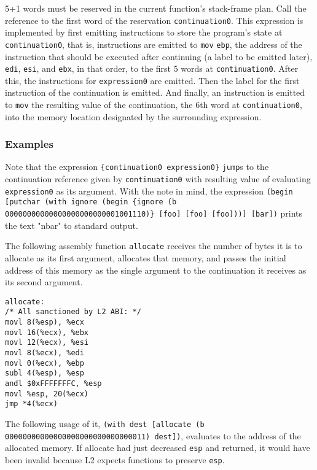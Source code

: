 \documentclass[twocolumn,landscape]{article}
\begin{document}
      5+1 words must be reserved in the current function's stack-frame plan. Call the reference to the first word of the reservation \lstinline{continuation0}. This expression is implemented by first emitting instructions to store the program's state at \lstinline{continuation0}, that is, instructions are emitted to \lstinline{mov} \lstinline{ebp}, the address of the instruction that should be executed after continuing (a label to be emitted later), \lstinline{edi}, \lstinline{esi}, and \lstinline{ebx}, in that order, to the first 5 words at \lstinline{continuation0}. After this, the instructions for \lstinline{expression0} are emitted. Then the label for the first instruction of the continuation is emitted. And finally, an instruction is emitted to \lstinline{mov} the resulting value of the continuation, the 6th word at \lstinline{continuation0}, into the memory location designated by the surrounding expression.

      \subsubsection{Examples}\label{sec:examples}
        Note that the expression \lstinline!{continuation0 expression0}! \lstinline{jump}s to the continuation reference given by \lstinline{continuation0} with resulting value of evaluating \lstinline{expression0} as its argument. With the note in mind, the expression \lstinline!(begin [putchar (with ignore (begin {ignore (b 00000000000000000000000001001110)} [foo] [foo] [foo]))] [bar])! prints the text "nbar" to standard output.

        The following assembly function \lstinline{allocate} receives the number of bytes it is to allocate as its first argument, allocates that memory, and passes the initial address of this memory as the single argument to the continuation it receives as its second argument.
        \begin{lstlisting}
allocate:
/* All sanctioned by L2 ABI: */
movl 8(%esp), %ecx
movl 16(%ecx), %ebx
movl 12(%ecx), %esi
movl 8(%ecx), %edi
movl 0(%ecx), %ebp
subl 4(%esp), %esp
andl $0xFFFFFFFC, %esp
movl %esp, 20(%ecx)
jmp *4(%ecx)
        \end{lstlisting}
        The following usage of it, \lstinline{(with dest [allocate (b 00000000000000000000000000000011) dest])}, evaluates to the address of the allocated memory. If allocate had just decreased \lstinline{esp} and returned, it would have been invalid because L2 expects functions to preserve \lstinline{esp}.
\end{document}
